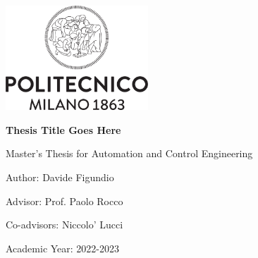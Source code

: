 \begin{titlepage}
    \begin{center}
        
        \includegraphics[width=0.4\textwidth]{images/polimi_logo.png}

        \vspace{2cm}
        \textbf{{\fontsize{40}{50}\selectfont Thesis Title Goes Here}}

        \vspace{0.5cm}
        \Large
        Master's Thesis for Automation and Control Engineering

        \vspace{1cm}

        Author: Davide Figundio\

        Advisor: Prof. Paolo Rocco\

        Co-advisors: Niccolo' Lucci\

        Academic Year: 2022-2023
    \end{center}
\end{titlepage}